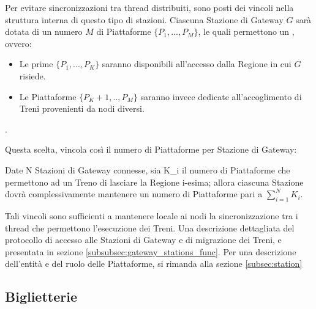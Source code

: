 	Per evitare sincronizzazioni tra thread distribuiti, sono posti dei vincoli nella struttura interna di questo tipo di stazioni. Ciascuna Stazione di Gateway $G$ sarà dotata di un numero $M$ di Piattaforme $\{P_1,...,P_M\}$, le quali permettono un , ovvero:
		
		\begin{itemize}
			\item Le prime $\{P_1,...,P_K\}$ saranno disponibili all'accesso dalla Regione in cui $G$ risiede.
			\item Le Piattaforme $\{P_K+1,..,P_M\}$ saranno invece dedicate all'accoglimento di Treni provenienti da nodi diversi.
		\end{itemize}.
	
	Questa scelta, vincola così il numero di Piattaforme per Stazione di Gateway: 
	
	\begin{consequence}
	Date N Stazioni di Gateway connesse, sia K\_i il numero di Piattaforme che permettono ad un Treno di lasciare la Regione i-esima; allora ciascuna Stazione dovrà complessivamente mantenere un numero di Piattaforme pari a $\sum_{i = 1}^{N}{K_i}$.
	\end{consequence}
	
	 Tali vincoli sono sufficienti a mantenere locale ai nodi la sincronizzazione tra i thread che permettono l'esecuzione dei Treni. Una descrizione dettagliata del protocollo di accesso alle Stazioni di Gateway e di migrazione dei Treni, e presentata in sezione \ref{subsubsec:gateway_stations_func}.
	Per una descrizione dell'entità e del ruolo delle Piattaforme, si rimanda alla sezione \ref{subsec:station}


	\subsection{Biglietterie}\label{subsec:ticket_offices}
	
